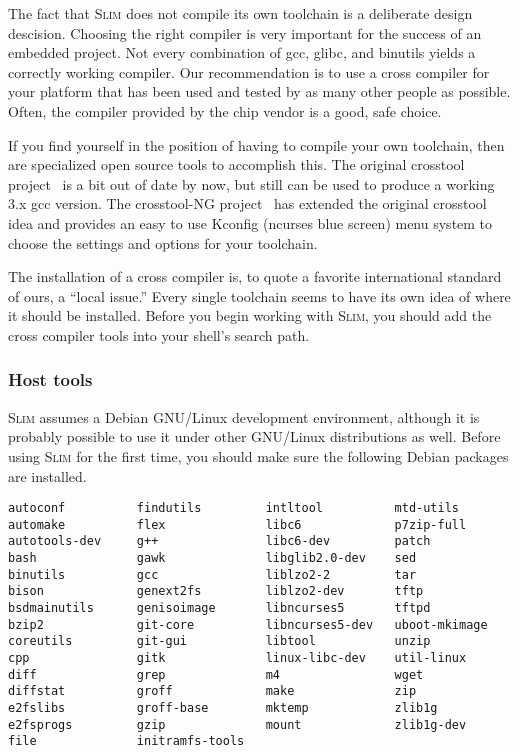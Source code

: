 \documentclass[a4paper,10pt]{article}
\newcommand{\slim}{\textsc{Slim}\xspace}
\begin{document}
    The fact that \slim does not compile its own toolchain is a
    deliberate design descision.  Choosing the right compiler is very
    important for the success of an embedded project.  Not every
    combination of gcc, glibc, and binutils yields a correctly working
    compiler.  Our recommendation is to use a cross compiler for your
    platform that has been used and tested by as many other people as
    possible.  Often, the compiler provided by the chip vendor is a
    good, safe choice.

    If you find yourself in the position of having to compile your own
    toolchain, then are specialized open source tools to accomplish
    this.
    The original crosstool project~\cite{kegel} is a bit out of date
    by now, but still can be used to produce a working 3.x gcc
    version.
    The crosstool-NG project~\cite{morin} has extended the original
    crosstool idea and provides an easy to use Kconfig (ncurses blue
    screen) menu system to choose the settings and options for your
    toolchain.

    The installation of a cross compiler is, to quote a favorite
    international standard of ours, a ``local issue.''  Every single
    toolchain seems to have its own idea of where it should be
    installed.  Before you begin working with \slim, you should add
    the cross compiler tools into your shell's search path.

\subsubsection{Host tools}

    \slim assumes a Debian GNU/Linux development environment, although
    it is probably possible to use it under other GNU/Linux
    distributions as well. Before using \slim for the first time, you
    should make sure the following Debian packages are installed.

\begin{verbatim}
autoconf          findutils         intltool          mtd-utils
automake          flex              libc6             p7zip-full
autotools-dev     g++               libc6-dev         patch
bash              gawk              libglib2.0-dev    sed
binutils          gcc               liblzo2-2         tar
bison             genext2fs         liblzo2-dev       tftp
bsdmainutils      genisoimage       libncurses5       tftpd
bzip2             git-core          libncurses5-dev   uboot-mkimage
coreutils         git-gui           libtool           unzip
cpp               gitk              linux-libc-dev    util-linux
diff              grep              m4                wget
diffstat          groff             make              zip
e2fslibs          groff-base        mktemp            zlib1g
e2fsprogs         gzip              mount             zlib1g-dev
file              initramfs-tools
\end{verbatim}
\end{document}
